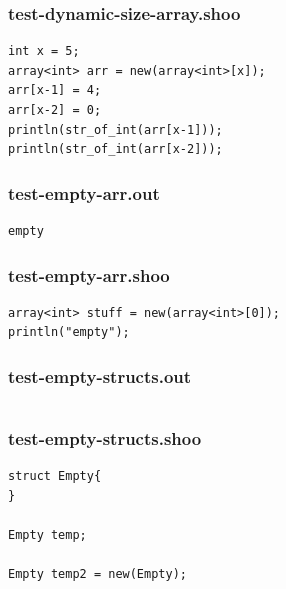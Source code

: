 \documentclass[12pt]{article}
\begin{document}
\subsubsection{test-dynamic-size-array.shoo}
\begin{mdframed}[hidealllines=true,backgroundcolor=blue!10]
\begin{lstlisting}
int x = 5;
array<int> arr = new(array<int>[x]);
arr[x-1] = 4;
arr[x-2] = 0;
println(str_of_int(arr[x-1]));
println(str_of_int(arr[x-2]));\end{lstlisting}
\end{mdframed}
\subsubsection{test-empty-arr.out}
\begin{mdframed}[hidealllines=true,backgroundcolor=green!10]
\begin{lstlisting}
empty\end{lstlisting}
\end{mdframed}
\subsubsection{test-empty-arr.shoo}
\begin{mdframed}[hidealllines=true,backgroundcolor=blue!10]
\begin{lstlisting}
array<int> stuff = new(array<int>[0]);
println("empty");\end{lstlisting}
\end{mdframed}
\subsubsection{test-empty-structs.out}
\begin{mdframed}[hidealllines=true,backgroundcolor=green!10]
\begin{lstlisting}
\end{lstlisting}
\end{mdframed}
\subsubsection{test-empty-structs.shoo}
\begin{mdframed}[hidealllines=true,backgroundcolor=blue!10]
\begin{lstlisting}
struct Empty{
}

Empty temp;

Empty temp2 = new(Empty);\end{lstlisting}
\end{mdframed}
\end{document}
